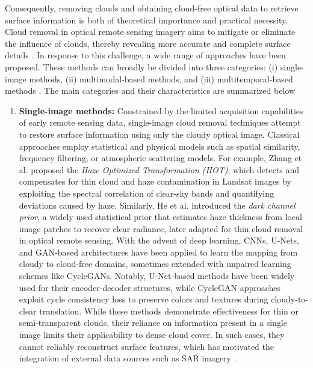 Consequently, removing clouds and obtaining cloud-free optical data to retrieve surface information is both of theoretical importance and practical necessity. Cloud removal in optical remote sensing imagery aims to mitigate or eliminate the influence of clouds, thereby revealing more accurate and complete surface details \cite{CR_Advances_Review_ORS}. In response to this challenge, a wide range of approaches have been proposed. These methods can broadly be divided into three categories: (i) single-image methods, (ii) multimodal-based methods, and (iii) multitemporal-based methods \cite{CR_Advances_Review_ORS}. The main categories and their characteristics are summarized below

\begin{enumerate}[label=(\Alph*)]
  \item \textbf{Single-image methods:} Constrained by the limited acquisition capabilities of early remote sensing data, single-image cloud removal techniques attempt to restore surface information using only the cloudy optical image. Classical approaches employ statistical and physical models such as spatial similarity, frequency filtering, or atmospheric scattering models. For example, Zhang et al. \cite{single_variation} proposed the \emph{Haze Optimized Transformation (HOT)}, which detects and compensates for thin cloud and haze contamination in Landsat images by exploiting the spectral correlation of clear-sky bands and quantifying deviations caused by haze. Similarly, He et al. \cite{single_haze_removal_dark_prior} introduced the \emph{dark channel prior}, a widely used statistical prior that estimates haze thickness from local image patches to recover clear radiance, later adapted for thin cloud removal in optical remote sensing. With the advent of deep learning, CNNs, U-Nets, and GAN-based architectures have been applied to learn the mapping from cloudy to cloud-free domains, sometimes extended with unpaired learning schemes like CycleGANs. Notably, U-Net-based methods have been widely used for their encoder-decoder structures, while CycleGAN approaches exploit cycle consistency loss to preserve colors and textures during cloudy-to-clear translation. While these methods demonstrate effectiveness for thin or semi-transparent clouds, their reliance on information present in a single image limits their applicability to dense cloud cover. In such cases, they cannot reliably reconstruct surface features, which has motivated the integration of external data sources such as SAR imagery \cite{CR_Advances_Review_ORS}.


\end{enumerate}
